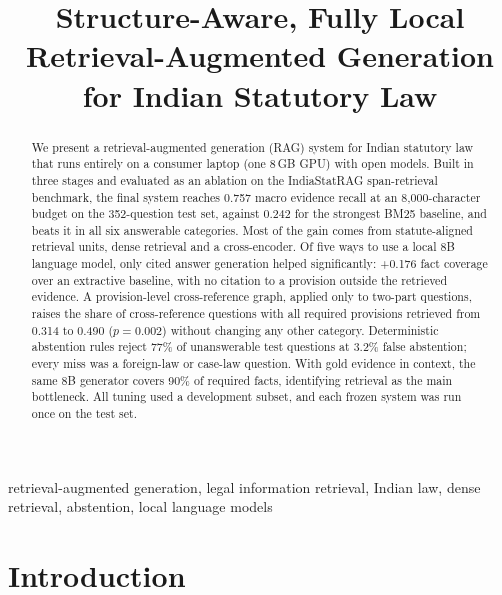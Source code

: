 \documentclass[conference]{IEEEtran}
\begin{document}
\title{Structure-Aware, Fully Local Retrieval-Augmented Generation for Indian Statutory Law}

\author{
}

\maketitle

\begin{abstract}
We present a retrieval-augmented generation (RAG) system for Indian statutory law that runs entirely on a consumer
laptop (one 8\,GB GPU) with open models. Built in three stages and evaluated as an ablation on the IndiaStatRAG
span-retrieval benchmark, the final system reaches 0.757 macro evidence recall at an 8,000-character budget on the
352-question test set, against 0.242 for the strongest BM25 baseline, and beats it in all six answerable
categories. Most of the gain comes from statute-aligned retrieval units, dense retrieval and a cross-encoder. Of
five ways to use a local 8B language model, only cited answer generation helped significantly: +0.176 fact coverage
over an extractive baseline, with no citation to a provision outside the retrieved evidence. A provision-level
cross-reference graph, applied only to two-part questions, raises the share of cross-reference questions with all
required provisions retrieved from 0.314 to 0.490 ($p=0.002$) without changing any other category. Deterministic
abstention rules reject 77\% of unanswerable test questions at 3.2\% false abstention; every miss was a foreign-law
or case-law question. With gold evidence in context, the same 8B generator covers 90\% of required facts,
identifying retrieval as the main bottleneck. All tuning used a development subset, and each frozen system was run
once on the test set.
\end{abstract}

\begin{IEEEkeywords}
retrieval-augmented generation, legal information retrieval, Indian law, dense retrieval, abstention, local language models
\end{IEEEkeywords}

\section{Introduction}
\end{document}
